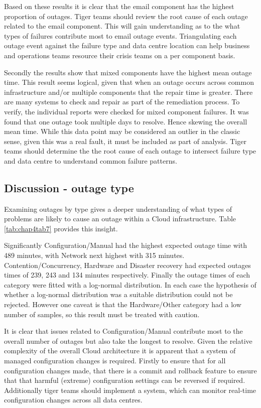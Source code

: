 Based on these results it is clear that the email component has the highest proportion of outages. Tiger teams should review the root cause of each outage related to the email component.  This will gain understanding as to the what types of failures contribute most to email outage events. Triangulating each outage event against the failure type and data centre location can help business and operations teams resource their crisis teams on a per component basis.

Secondly the results show that mixed components have the highest mean outage time. This result seems logical, given that when an outage occurs across common infrastructure and/or multiple components that the repair time is greater. There are many systems to check and repair as part of the remediation process. To verify, the individual reports were checked for mixed component failures. It was found that one outage took multiple days to resolve. Hence skewing the overall mean time. While this data point may be considered an outlier in the classic sense, given this was a real fault, it must be included as part of analysis. Tiger teams should determine the the root cause of each outage to intersect failure type and data centre to understand common failure patterns. \par


\subsection{Discussion - outage type}
Examining outages by type gives a deeper understanding of what types of problems are likely to cause an outage within a Cloud infrastructure. Table \ref{tab:chap4tab7} provides this insight. \par

Significantly Configuration/Manual had the highest expected outage time with 489 minutes, with Network next highest with 315 minutes. Contention/Concurrency, Hardware and Disaster recovery had expected outages times of 239, 243 and 134 minutes respectively. Finally the outage times of each category were fitted with a log-normal distribution. In each case the hypothesis of whether a log-normal distribution was a suitable distribution could not be rejected. However one caveat is that the Hardware/Other category had a low number of samples, so this result must be treated with caution. \par

It is clear that issues related to Configuration/Manual contribute most to the overall number of outages but also take the longest to resolve.  Given the relative complexity of the overall Cloud architecture it is apparent that a system of managed configuration changes is required. Firstly to ensure that for all configuration changes made, that there is a commit and rollback feature to ensure that that harmful (extreme) configuration settings can be reversed if required. Additionally tiger teams should implement a system, which can monitor real-time configuration changes across all data centres.  \par

